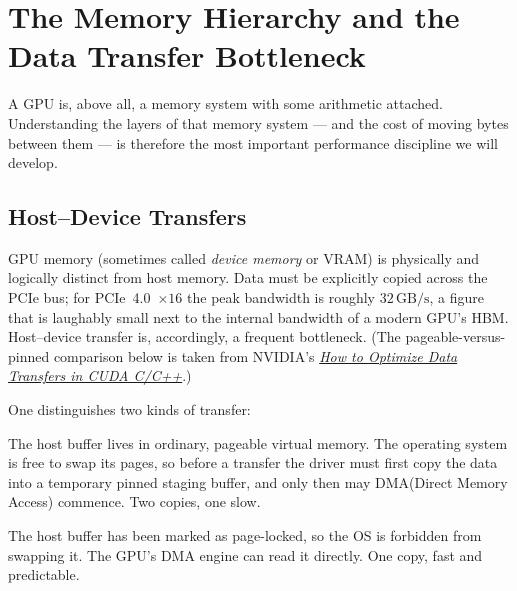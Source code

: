 \documentclass[11pt,a4paper]{article}
\theoremstyle{definition}
\theoremstyle{remark}
\theoremstyle{plain}
\begin{document}
\section{The Memory Hierarchy and the Data Transfer Bottleneck}

A GPU is, above all, a memory system with some arithmetic attached.
Understanding the layers of that memory system --- and the cost of
moving bytes between them --- is therefore the most important
performance discipline we will develop.

\subsection{Host--Device Transfers}

GPU memory (sometimes called \emph{device memory} or VRAM) is
physically and logically distinct from host memory. Data must be
explicitly copied across the PCIe bus; for PCIe~4.0~$\times 16$ the
peak bandwidth is roughly $32\,\text{GB/s}$, a figure that is
laughably small next to the internal bandwidth of a modern GPU's
HBM. Host--device transfer is, accordingly, a frequent bottleneck.
(The pageable-versus-pinned comparison below is taken from NVIDIA's
\href{https://developer.nvidia.com/blog/how-optimize-data-transfers-cuda-cc/}{\textit{How
to Optimize Data Transfers in CUDA C/C++}}.)

One distinguishes two kinds of transfer:

\begin{description}[leftmargin=1.8em, style=nextline]
    \item[Pageable transfer.] The host buffer lives in ordinary,
        pageable virtual memory. The operating system is free to
        swap its pages, so before a transfer the driver must first
        copy the data into a temporary pinned staging buffer, and
        only then may DMA(Direct Memory Access) commence. Two copies, one slow.
    \item[Pinned (page-locked) transfer.] The host buffer has been
        marked as page-locked, so the OS is forbidden from swapping
        it. The GPU's DMA engine can read it directly. One copy,
        fast and predictable.
\end{description}
\end{document}
